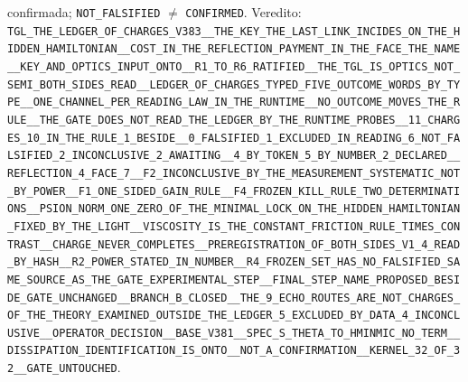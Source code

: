 \documentclass[11pt]{article}
\theoremstyle{definition}\newtheorem{deriv}{Derivação}
\begin{document}
confirmada; \texttt{NOT\_FALSIFIED} $\neq$ \texttt{CONFIRMED}. Veredito: \texttt{TGL\_THE\_LEDGER\_OF\_CHARGES\_V383\_\_THE\_KEY\_THE\_LAST\_LINK\_INCIDES\_ON\_THE\_HIDDEN\_HAMILTONIAN\_\_COST\_IN\_THE\_REFLECTION\_PAYMENT\_IN\_THE\_FACE\_THE\_NAME\_\_KEY\_AND\_OPTICS\_INPUT\_ONTO\_\_R1\_TO\_R6\_RATIFIED\_\_THE\_TGL\_IS\_OPTICS\_NOT\_SEMI\_BOTH\_SIDES\_READ\_\_LEDGER\_OF\_CHARGES\_TYPED\_FIVE\_OUTCOME\_WORDS\_BY\_TYPE\_\_ONE\_CHANNEL\_PER\_READING\_LAW\_IN\_THE\_RUNTIME\_\_NO\_OUTCOME\_MOVES\_THE\_RULE\_\_THE\_GATE\_DOES\_NOT\_READ\_THE\_LEDGER\_BY\_THE\_RUNTIME\_PROBES\_\_11\_CHARGES\_10\_IN\_THE\_RULE\_1\_BESIDE\_\_0\_FALSIFIED\_1\_EXCLUDED\_IN\_READING\_6\_NOT\_FALSIFIED\_2\_INCONCLUSIVE\_2\_AWAITING\_\_4\_BY\_TOKEN\_5\_BY\_NUMBER\_2\_DECLARED\_\_REFLECTION\_4\_FACE\_7\_\_F2\_INCONCLUSIVE\_BY\_THE\_MEASUREMENT\_SYSTEMATIC\_NOT\_BY\_POWER\_\_F1\_ONE\_SIDED\_GAIN\_RULE\_\_F4\_FROZEN\_KILL\_RULE\_TWO\_DETERMINATIONS\_\_PSION\_NORM\_ONE\_ZERO\_OF\_THE\_MINIMAL\_LOCK\_ON\_THE\_HIDDEN\_HAMILTONIAN\_FIXED\_BY\_THE\_LIGHT\_\_VISCOSITY\_IS\_THE\_CONSTANT\_FRICTION\_RULE\_TIMES\_CONTRAST\_\_CHARGE\_NEVER\_COMPLETES\_\_PREREGISTRATION\_OF\_BOTH\_SIDES\_V1\_4\_READ\_BY\_HASH\_\_R2\_POWER\_STATED\_IN\_NUMBER\_\_R4\_FROZEN\_SET\_HAS\_NO\_FALSIFIED\_SAME\_SOURCE\_AS\_THE\_GATE\_EXPERIMENTAL\_STEP\_\_FINAL\_STEP\_NAME\_PROPOSED\_BESIDE\_GATE\_UNCHANGED\_\_BRANCH\_B\_CLOSED\_\_THE\_9\_ECHO\_ROUTES\_ARE\_NOT\_CHARGES\_OF\_THE\_THEORY\_EXAMINED\_OUTSIDE\_THE\_LEDGER\_5\_EXCLUDED\_BY\_DATA\_4\_INCONCLUSIVE\_\_OPERATOR\_DECISION\_\_BASE\_V381\_\_SPEC\_S\_THETA\_TO\_HMINMIC\_NO\_TERM\_\_DISSIPATION\_IDENTIFICATION\_IS\_ONTO\_\_NOT\_A\_CONFIRMATION\_\_KERNEL\_32\_OF\_32\_\_GATE\_UNTOUCHED}.
\end{document}
